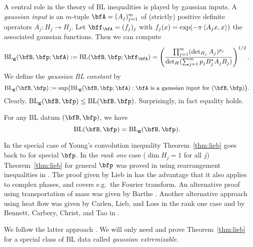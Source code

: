 A central role in the theory of BL inequalities is played by gaussian inputs.
A \emph{gaussian input} is an $m$-tuple $\bfA = (A_{j})_{j=1}^{m}$ of (strictly) positive definite operators $A_{j} : H_{j} \to H_{j}$.
Let $\bff_{\bfA} = (f_{j})_{j}$ with $f_{j}(x) = \exp( -\pi \left\langle A_{j}x,x\right\rangle )$ the associated gaussian functions.
Then we can compute
\begin{equation}\label{BLfunctional(not)}
\BLg( \bfB,\p; \A)
:=
\BL( \bfB,\p; \bff_{\A})
=
\left( \frac{\prod_{j=1}^m (\det_{H_j}
A_j)^{p_j}} {\det_H (\sum_{j=1}^m p_j B_j^* A_j B_j)}
\right)^{1/2}.
\end{equation}
We define the \emph{gaussian BL constant} by
\begin{equation}\label{BLfunctional}
\BLg( \bfB,\p) :=
\sup \{ \BLg(\bfB,\p;\A): \A \text{ is a gaussian input for } (\bfB,\p)\}.
\end{equation}
Clearly, $\BLg(\bfB,\p) \leq \BL(\bfB,\p)$.
Surprisingly, in fact equality holds.
\begin{theorem}[{\cite{MR1069246}}]
\label{thm:lieb}
For any BL datum $(\bfB,\p)$, we have
\[
\BL( \bfB, \p ) = \BLg( \bfB, \p ).
\]
\end{theorem}
In the special case of Young's convolution inequality Theorem~\ref{thm:lieb} goes back to \cite{MR0385456} for special $\p$.
In the \emph{rank one} case ($\dim H_{j}=1$ for all $j$) Theorem~\ref{thm:lieb} for general $\p$ was proved in \cite{MR0412366} using rearrangement inequalities in \cite{MR0346109}.
The proof given by Lieb in \cite{MR1069246} has the advantage that it also applies to complex phases, and covers e.g.\ the Fourier transform.
An alternative proof using transportation of mass was given by Barthe \cite{MR1650312}.
Another alternative approach using heat flow was given by Carlen, Lieb, and Loss \cite{MR2077162} in the rank one case and by Bennett, Carbery, Christ, and Tao in \cite{MR2377493}.

We follow the latter approach \cite{MR2377493}.
We will only need and prove Theorem~\ref{thm:lieb} for a special class of BL data called \emph{gaussian extremizable}.

